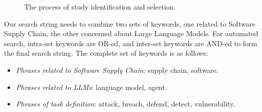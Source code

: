 \begin{figure}[ht]

\caption{The process of study identification and selection.}
\label{fig:stusel}
\end{figure}

\par Our search string needs to combine two sets of keywords, one related
to Software Supply Chain, the other concerned about Large Language Models.
For automated search, intra-set keywords are OR-ed, and inter-set keywords
are AND-ed to form the final search string.
The complete set of keywords is as follows:

\begin{itemize}
  \item \textit{Phrases related to Software Supply Chain}: supply chain, software.

  \item \textit{Phrases related to LLMs}: language model, agent.

  \item \textit{Phrases of task definition}: attack, breach, defend, detect, vulnerability.
\end{itemize}

